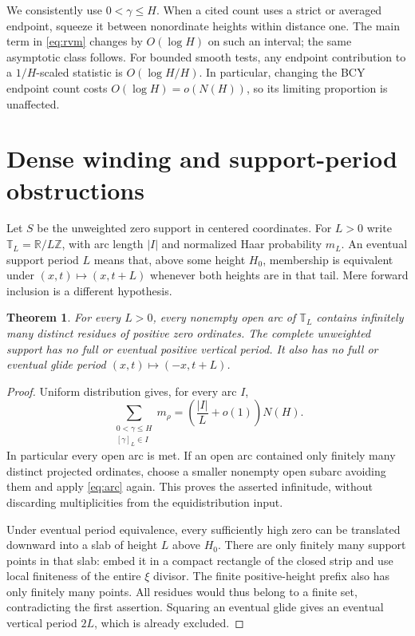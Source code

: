 \documentclass[11pt,a4paper]{article}
\newtheorem{theorem}{Theorem}[section]
\theoremstyle{definition}
\theoremstyle{remark}
\newcommand{\R}{\mathbb R}
\newcommand{\Z}{\mathbb Z}
\newcommand{\T}{\mathbb T}
\begin{document}
We consistently use $0<\gamma\le H$. When a cited count uses a strict or
averaged endpoint, squeeze it between nonordinate heights within distance
one. The main term in \eqref{eq:rvm} changes by $O(\log H)$ on such an
interval; the same asymptotic class follows. For bounded smooth tests,
any endpoint contribution to a $1/H$-scaled statistic is $O(\log H/H)$.
In particular, changing the BCY endpoint count costs
$O(\log H)=o(N(H))$, so its limiting proportion is unaffected.

\section{Dense winding and support-period obstructions}

Let $S$ be the unweighted zero support in centered coordinates. For $L>0$
write $\T_L=\R/L\Z$, with arc length $|I|$ and normalized Haar probability
$m_L$. An eventual support period $L$ means that, above some height $H_0$,
membership is equivalent under $(x,t)\mapsto(x,t+L)$ whenever both heights
are in that tail. Mere forward inclusion is a different hypothesis.

\begin{theorem}\label{thm:support}
For every $L>0$, every nonempty open arc of $\T_L$ contains infinitely many
distinct residues of positive zero ordinates. The complete unweighted support
has no full or eventual positive vertical period. It also has no full or
eventual glide period $(x,t)\mapsto(-x,t+L)$.
\end{theorem}
\begin{proof}
Uniform distribution gives, for every arc $I$,
\begin{equation}\label{eq:arc}
 \sum_{\substack{0<\gamma\le H\\{}[\gamma]_L\in I}}m_\rho
   =\left(\frac{|I|}{L}+o(1)\right)N(H).
\end{equation}
In particular every open arc is met. If an open arc contained only finitely
many distinct projected ordinates, choose a smaller nonempty open subarc
avoiding them and apply \eqref{eq:arc} again. This proves the asserted
infinitude, without discarding multiplicities from the equidistribution input.

Under eventual period equivalence, every sufficiently high zero can be
translated downward into a slab of height $L$ above $H_0$. There are only
finitely many support points in that slab: embed it in a compact rectangle
of the closed strip and use local finiteness of the entire $\xi$ divisor.
The finite positive-height prefix also has only finitely many points.
All residues would thus belong to a finite set, contradicting the first
assertion. Squaring an eventual glide gives an eventual vertical period
$2L$, which is already excluded.
\end{proof}
\end{document}
